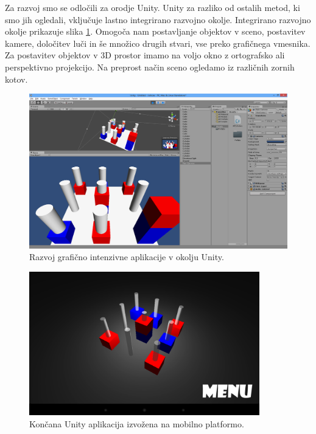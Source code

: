 Za razvoj smo se odločili za orodje Unity. Unity za razliko od ostalih metod, ki smo  jih ogledali, vključuje lastno integrirano razvojno okolje. Integrirano razvojno okolje prikazuje slika \ref{mineditor}. Omogoča nam postavljanje objektov v sceno, postavitev kamere, določitev luči in še množico drugih stvari, vse preko grafičnega vmesnika. Za postavitev objektov v 3D prostor imamo na voljo okno z ortografsko ali perspektivno projekcijo. Na preprost način sceno ogledamo iz različnih zornih kotov.


\begin{figure}
\begin{center}
\includegraphics[width=12cm]{pic/min-editor.png}
\end{center}
\caption{Razvoj grafično intenzivne aplikacije v okolju Unity.}
\label{mineditor}
\end{figure} 

\begin{figure}
\begin{center}
\includegraphics[width=10cm]{pic/min-play.png}
\end{center}
\caption{Končana Unity aplikacija izvožena na mobilno platformo.}
\label{minplay}
\end{figure} 

